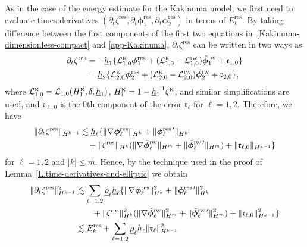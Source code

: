 \documentclass[11pt,leqno]{article}
\numberwithin{equation}{section}
\numberwithin{figure}{section}
\begin{document}
As in the case of the energy estimate for the Kakinuma model, we first need to evaluate times derivatives 
$(\partial_t\zeta^\mathrm{res},\partial_t\bm{\phi}_1^\mathrm{res},\partial_t\bm{\phi}_2^\mathrm{res})$ 
in terms of $E_k^\mathrm{res}$. 
By taking difference between the first components of the first two equations in~\eqref{Kakinuma-dimensionless-compact} and 
\eqref{app-Kakinuma}, $\partial_t\zeta^\mathrm{res}$ can be written in two ways as 
%
\begin{align*}
\partial_t\zeta^\mathrm{res}
&= -\underline{h}_1\{ \mathcal{L}_{1,0}^{\mbox{\rm\tiny K}}\bm{\phi}_1^\mathrm{res}
 + (\mathcal{L}_{1,0}^{\mbox{\rm\tiny K}}-\mathcal{L}_{1,0}^{\mbox{\rm\tiny IW}})\tilde{\bm{\phi}}_1^{\mbox{\rm\tiny IW}}
 + \mathfrak{r}_{1,0} \} \\
&= \underline{h}_2\{ \mathcal{L}_{2,0}^{\mbox{\rm\tiny K}}\bm{\phi}_2^\mathrm{res}
 + (\mathcal{L}_{2,0}^{\mbox{\rm\tiny K}}-\mathcal{L}_{2,0}^{\mbox{\rm\tiny IW}})\tilde{\bm{\phi}}_2^{\mbox{\rm\tiny IW}}
 + \mathfrak{r}_{2,0} \},
\end{align*}
%
where $\mathcal{L}_{1,0}^{\mbox{\rm\tiny K}}=\mathcal{L}_{1,0}(H_1^{\mbox{\rm\tiny K}},\delta,\underline{h}_1)$, 
$H_1^{\mbox{\rm\tiny K}}=1-\underline{h}_1^{-1}\zeta^{\mbox{\rm\tiny K}}$, and similar simplifications are used, 
and $\mathfrak{r}_{\ell,0}$ is the $0$th component of the error $\bm{\mathfrak{r}}_\ell$ for $\ell=1,2$. 
Therefore, we have 
%
\begin{align*}
\|\partial_t\zeta^\mathrm{res}\|_{H^{k-1}}
&\lesssim \underline{h}_\ell\{ \|\nabla\bm{\phi}_\ell^\mathrm{res}\|_{H^k} 
 + \|\bm{\phi}_{\ell}^\mathrm{res\, \prime}\|_{H^k} \\
&\quad
 + \|\zeta^\mathrm{res}\|_{H^k} ( \|\nabla\tilde{\bm{\phi}}_\ell^{\mbox{\rm\tiny IW}}\|_{H^m} 
 + \|\tilde{\bm{\phi}}_{\ell}^\mathrm{\mbox{\rm\tiny IW}\, \prime}\|_{H^m} )
 + \|\mathfrak{r}_{\ell,0}\|_{H^{k-1}} \}
\end{align*}
%
for $\ell=1,2$ and $|k|\leq m$. 
Hence, by the technique used in the proof of Lemma~\ref{L.time-derivatives-and-elliptic} we obtain 
%
\begin{align*}
\|\partial_t\zeta^\mathrm{res}\|_{H^{k-1}}^2
&\lesssim \sum_{\ell=1,2} \underline{\rho}_\ell \underline{h}_\ell\{
 \|\nabla\bm{\phi}_\ell^\mathrm{res}\|_{H^k}^2 
 + \|\bm{\phi}_{\ell}^\mathrm{res\, \prime}\|_{H^k}^2 \\
&\qquad
 + \|\zeta^\mathrm{res}\|_{H^k}^2 ( \|\nabla\tilde{\bm{\phi}}_\ell^{\mbox{\rm\tiny IW}}\|_{H^m}^2 
 + \|\tilde{\bm{\phi}}_{\ell}^\mathrm{\mbox{\rm\tiny IW}\, \prime}\|_{H^m}^2 ) + \|\mathfrak{r}_{\ell,0}\|_{H^{k-1}}^2 \} \\
&\lesssim E_k^\mathrm{res} + \sum_{\ell=1,2} \underline{\rho}_\ell \underline{h}_\ell \|\bm{\mathfrak{r}}_\ell\|_{H^{k-1}}^2
\end{align*}
\end{document}
